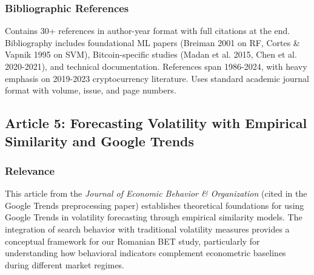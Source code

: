 \documentclass[12pt,a4paper]{article}
\begin{document}
\subsubsection{Bibliographic References}
Contains 30+ references in author-year format with full citations at the end. Bibliography includes foundational ML papers (Breiman 2001 on RF, Cortes \& Vapnik 1995 on SVM), Bitcoin-specific studies (Madan et al. 2015, Chen et al. 2020-2021), and technical documentation. References span 1986-2024, with heavy emphasis on 2019-2023 cryptocurrency literature. Uses standard academic journal format with volume, issue, and page numbers.

\subsection{Article 5: Forecasting Volatility with Empirical Similarity and Google Trends}

\subsubsection{Relevance}
This article from the \textit{Journal of Economic Behavior \& Organization} (cited in the Google Trends preprocessing paper) establishes theoretical foundations for using Google Trends in volatility forecasting through empirical similarity models. The integration of search behavior with traditional volatility measures provides a conceptual framework for our Romanian BET study, particularly for understanding how behavioral indicators complement econometric baselines during different market regimes.
\end{document}
